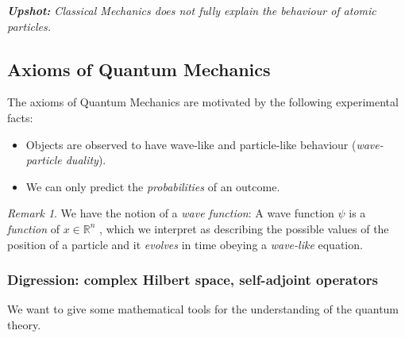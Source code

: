 \documentclass[12pt]{amsart}
\numberwithin{equation}{section}
\theoremstyle{plain}
\theoremstyle{definition}
\theoremstyle{remark}
\newtheorem{rem}{Remark}[subsection]
\newcommand{\R}{\mathbb{R}}
\begin{document}
\vspace{0.3cm}
\emph{{\bf Upshot:} Classical Mechanics does not fully explain the behaviour of atomic particles.}
\vspace{0.3cm}


\subsection{Axioms of Quantum Mechanics}
The axioms of Quantum Mechanics are motivated by the following experimental facts:
\begin{itemize}
\item{Objects are observed to have wave-like and particle-like behaviour (\emph{wave-particle duality}).
}
\item{We can only predict the \emph{probabilities} of an outcome.}
\end{itemize}

\begin{rem}
We have the notion of a \emph{wave function}: A wave function $\psi$ is a \emph{function} of $x\in\R^n$ , which we interpret as describing the possible values of the position of a particle and it \emph{evolves} in time obeying a \emph{wave-like} equation.
\end{rem}

\subsubsection{Digression: complex Hilbert space, self-adjoint operators} We want to give some mathematical tools for the understanding of the quantum theory. 
\end{document}
